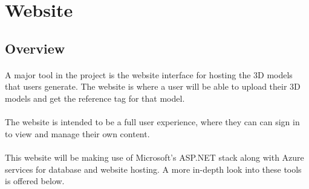 
 \section{Website}

 \subsection{Overview}
 \paragraph{}
 A major tool in the project is the website interface for hosting the 3D models that users generate.
 The website is where a user will be able to upload their 3D models
 and get the reference tag for that model.
 
 \paragraph{}
 The website is intended to be a full user experience, where they can
 can sign in to view and manage their own content.

\paragraph{}
This website will be making use of Microsoft's ASP.NET stack along with
Azure services for database and website hosting. A more in-depth look into 
these tools is offered below.

